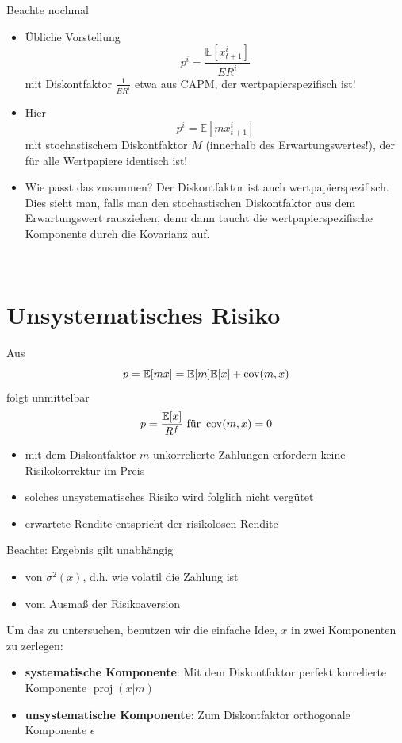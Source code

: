 \documentclass[12pt]{extreport} %
\theoremstyle{named}
\theoremstyle{nnamed}
\theoremstyle{itshape}
\theoremstyle{normal}
\begin{document}
Beachte nochmal

\begin{itemize}
	\item Übliche Vorstellung
		$$ p^i = \frac{\mathbb{E}[x_{t+1}^i]}{ER^i} $$
		mit Diskontfaktor $\frac{1}{ER^i}$ etwa aus CAPM, der wertpapierspezifisch ist!
	\item Hier
		$$ p^i = \mathbb{E}[m x_{t+1}^i] $$
		mit stochastischem Diskontfaktor $M$ (innerhalb des Erwartungswertes!), der für alle Wertpapiere identisch ist!
	\item Wie passt das zusammen? Der Diskontfaktor ist auch wertpapierspezifisch. Dies sieht man, falls man den stochastischen Diskontfaktor aus dem Erwartungswert rausziehen, denn dann taucht die wertpapierspezifische Komponente durch die Kovarianz auf.
\end{itemize}

~\newpage

\section{Unsystematisches Risiko}

Aus 
$$ p = \mathbb{E}[mx] = \mathbb{E}[m] \mathbb{E} [x] + \operatorname{cov}(m,x)$$
folgt unmittelbar
$$ p = \frac{\mathbb{E}[x]}{R^f} \text{ für } \operatorname{cov}(m, x) = 0 $$
\begin{itemize}
	\item mit dem Diskontfaktor $m$ unkorrelierte Zahlungen erfordern keine Risikokorrektur im Preis
	\item solches unsystematisches Risiko wird folglich nicht vergütet
	\item erwartete Rendite entspricht der risikolosen Rendite
\end{itemize}
Beachte: Ergebnis gilt unabhängig
\begin{itemize}
	\item von $\sigma^2(x)$, d.h. wie volatil die Zahlung ist
	\item vom Ausmaß der Risikoaversion
\end{itemize}

Um das zu untersuchen, benutzen wir die einfache Idee, $x$ in zwei Komponenten zu zerlegen:
\begin{itemize}
	\item \textbf{systematische Komponente}: Mit dem Diskontfaktor perfekt korrelierte Komponente $\operatorname{proj}(x|m)$
	\item \textbf{unsystematische Komponente}: Zum Diskontfaktor orthogonale Komponente $\epsilon$
\end{itemize}
\end{document}
